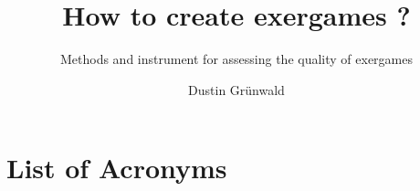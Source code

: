 \documentclass[
	language=english, %
	thesis={type=Seminar Paper}, %
	class=report,%
	ruledheaders=section,%
	accentcolor=3d,%
	marginpar=false,%
	parskip=half-,%
	fontsize=11pt,%
	IMRAD=false %
]{tudapub}
\begin{document}

\title{How to create exergames ?}
\subtitle{Methods and instrument for assessing the quality of exergames}
\author[D. Grünwald]{Dustin Grünwald} %



\maketitle
\affidavit %
\tableofcontents

\begin{multicols}{2}

\end{multicols}
\clearpage
\chapter*{List of Acronyms}
\printacronyms[heading={none}]

\printbibliography

\appendix

\languagename
\end{document}
